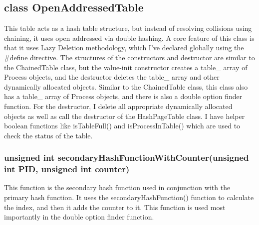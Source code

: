 \subsection{{\color{orange}class} {\color{draculapurple}OpenAddressedTable}}
    This table acts as a hash table structure, but instead of resolving collisions using chaining, it uses open addressed via double hashing.
    A core feature of this class is that it uses Lazy Deletion methodology, which I've declared globally using the {\color{orange}\#define} directive.
    The structures of the constructors and destructor are similar to the {\color{draculapurple}ChainedTable} class, but the value-init {\color{draculapurple}constructor} creates a {\color{Turquoise}table\_} array of {\color{draculapurple}Process} objects, and the {\color{draculapurple}destructor} deletes the {\color{Turquoise}table\_} array and other dynamically allocated objects.
    Similar to the {\color{draculapurple}ChainedTable} class, this class also has a {\color{Turquoise}table\_} array of {\color{draculapurple}Process} objects, and there is also a double option finder function.
    For the destructor, I delete all appropriate dynamically allocated objects as well as call the destructor of the {\color{draculapurple}HashPageTable} class.
    I have helper boolean functions like {\color{draculapurple}isTableFull()} and {\color{draculapurple}isProcessInTable()} which are used to check the status of the table.

    \subsubsection{{\color{orange}unsigned int} {\color{draculapurple}secondaryHashFunctionWithCounter}({\color{orange}unsigned int} PID, {\color{orange}unsigned int} counter)}
        This function is the secondary hash function used in conjunction with the primary hash function. It uses the {\color{draculapurple}secondaryHashFunction()} function to calculate the index, and then it adds the {\color{orange}counter} to it.
        This function is used most importantly in the double option finder function. 
        

